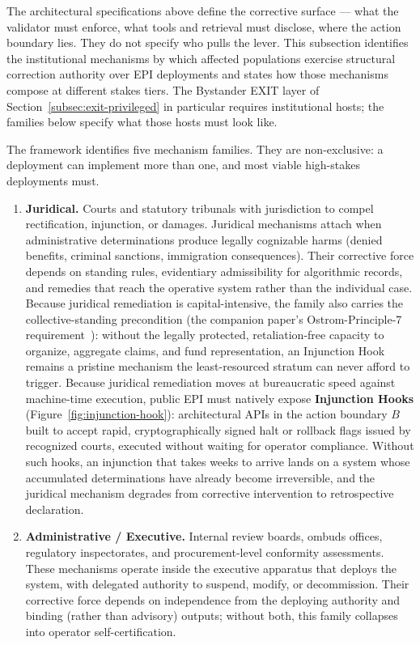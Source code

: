 \documentclass{article}
\theoremstyle{definition}
\begin{document}
The architectural specifications above define the corrective surface --- what the validator must enforce, what tools and retrieval must disclose, where the action boundary lies. They do not specify who pulls the lever. This subsection identifies the institutional mechanisms by which affected populations exercise structural correction authority over EPI deployments and states how those mechanisms compose at different stakes tiers. The Bystander EXIT layer of Section~\ref{subsec:exit-privileged} in particular requires institutional hosts; the families below specify what those hosts must look like.

The framework identifies five mechanism families. They are non-exclusive: a deployment can implement more than one, and most viable high-stakes deployments must.

\begin{enumerate}[noitemsep]
    \item \textbf{Juridical.} Courts and statutory tribunals with jurisdiction to compel rectification, injunction, or damages. Juridical mechanisms attach when administrative determinations produce legally cognizable harms (denied benefits, criminal sanctions, immigration consequences). Their corrective force depends on standing rules, evidentiary admissibility for algorithmic records, and remedies that reach the operative system rather than the individual case. Because juridical remediation is capital-intensive, the family also carries the collective-standing precondition (the companion paper's Ostrom-Principle-7 requirement~\citep{aravind2026dpi}): without the legally protected, retaliation-free capacity to organize, aggregate claims, and fund representation, an Injunction Hook remains a pristine mechanism the least-resourced stratum can never afford to trigger. Because juridical remediation moves at bureaucratic speed against machine-time execution, public EPI must natively expose \textbf{Injunction Hooks} (Figure~\ref{fig:injunction-hook}): architectural APIs in the action boundary $B$ built to accept rapid, cryptographically signed halt or rollback flags issued by recognized courts, executed without waiting for operator compliance. Without such hooks, an injunction that takes weeks to arrive lands on a system whose accumulated determinations have already become irreversible, and the juridical mechanism degrades from corrective intervention to retrospective declaration.

    \item \textbf{Administrative / Executive.} Internal review boards, ombuds offices, regulatory inspectorates, and procurement-level conformity assessments. These mechanisms operate inside the executive apparatus that deploys the system, with delegated authority to suspend, modify, or decommission. Their corrective force depends on independence from the deploying authority and binding (rather than advisory) outputs; without both, this family collapses into operator self-certification.


\end{enumerate}
\end{document}
